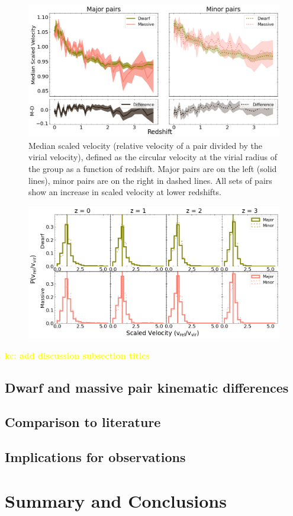 \documentclass[twocolumn]{aastex631}
\newcommand{\kc}[1]{\textcolor{yellow}{\textbf{kc: #1}} }
\begin{document}
\begin{figure}[htb]
  \centering
  \includegraphics[width=\textwidth]{scaledvel.png}
  \caption{Median scaled velocity (relative velocity of a pair divided by the virial velocity), defined as the circular velocity at the virial radius of the group as a function of redshift. 
  Major pairs are on the left (solid lines), minor pairs are on the right in dashed lines.
  All sets of pairs show an increase in scaled velocity at lower redshifts.
  }
  \label{fig:vel-scaled}
\end{figure} 

\begin{figure}[htb]
  \centering
  \includegraphics[width=\textwidth]{scaledvel_distribution.png}
  \caption{}
  \label{fig:vel-scaled-dist}
\end{figure} 


\kc{add discussion subsection titles}
\subsection{Dwarf and massive pair kinematic differences}
\subsection{Comparison to literature}
\subsection{Implications for observations}


\section{Summary and Conclusions}
\label{sec:summary}


{}

\end{document}
